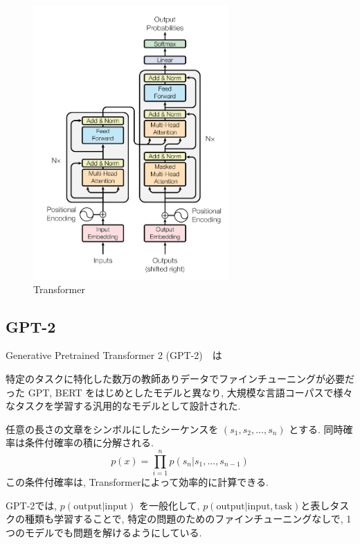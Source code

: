 \documentclass[twocolumn]{jarticle}     %
\begin{document}
\begin{figure}[tb]
  \begin{center}
    \includegraphics[clip,width=75mm]{Transformer.png}
    \caption{Transformer}
    \label{fig:trans}
  \end{center}
\end{figure}



\subsection{GPT-2}
Generative Pretrained Transformer 2 (GPT-2)\cite{radford2019language}　は

特定のタスクに特化した数万の教師ありデータでファインチューニングが必要だった GPT, BERT をはじめとしたモデルと異なり,
大規模な言語コーパスで様々なタスクを学習する汎用的なモデルとして設計された.

任意の長さの文章をシンボルにしたシーケンスを $(s_1, s_2, ..., s_n)$ とする.
同時確率は条件付確率の積に分解される.
\begin{equation}
p(x) = \prod^n_{i=1} p(s_n|s_1, ... , s_{n-1})
\end{equation}
この条件付確率は, Transformer\cite{DBLP:journals/corr/VaswaniSPUJGKP17}によって効率的に計算できる.

GPT-2では, $p(\mathrm{output}|\mathrm{input})$ を一般化して,
$p(\mathrm{output}| \mathrm{input}, \mathrm{task})$と表しタスクの種類も学習することで, 特定の問題のためのファインチューニングなしで, 1つのモデルでも問題を解けるようにしている.
\end{document}
